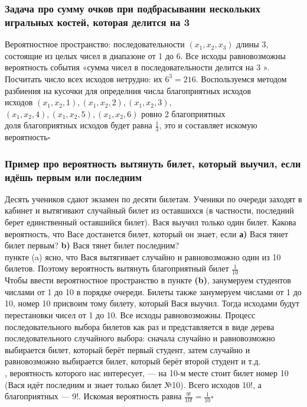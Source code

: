 \documentclass[a4paper]{article}
\newcommand{\qed}{\hfill$\square$}
\begin{document}
\subsubsection*{Задача про сумму очков при подбрасывании нескольких игральных костей, которая делится на 3}
Вероятностное пространство: последовательности $\left(x_1, x_2, x_3\right)$ длины 3, состоящие из целых чисел в диапазоне от 1 до 6. Все исходы равновозможны\\[2mm]
 вероятность события «сумма чисел в последовательности делится на 3 ». Посчитать число всех исходов нетрудно: их $6^3=216$. Воспользуемся методом разбиения на кусочки для определния числа благоприятных исходов\\
 исходов $(x_1, x_2, 1),(x_1, x_2, 2),(x_1, x_2, 3),$ $(x_1, x_2, 4),(x_1, x_2, 5),(x_1, x_2, 6)$ ровно 2 благоприятных\\
 доля благоприятных исходов будет равна $\frac{1}{3}$, это и составляет искомую вероятность\qed

\subsubsection*{Пример про вероятность вытянуть билет, который выучил, если идёшь первым или последним}
Десять учеников сдают экзамен по десяти билетам. Ученики по очереди заходят в кабинет и вытягивают случайный билет из оставшихся (в частности, последний берет единственный оставшийся билет). Вася выучил только один билет. Какова вероятность, что Васе достанется билет, который он знает, если \textbf{а)} Вася тянет билет первым? \textbf{b)} Вася тянет билет последним?\\[2mm]
 пункте (a) ясно, что Вася вытягивает случайно и равновозможно один из 10 билетов. Поэтому вероятность вытянуть благоприятный билет $\frac{1}{10}$\\[2mm]
\indent Чтобы ввести вероятностное пространство в пункте \textbf{(b)}, занумеруем студентов числами от 1 до 10 в порядке очереди. Билеты также занумеруем числами от 1 до 10, номер 10 присвоим тому билету, который Вася выучил. Тогда исходами будут перестановки чисел от 1 до 10. Все исходы равновозможны. Процесс последовательного выбора билетов как раз и представляется в виде дерева последовательного случайного выбора: сначала случайно и равновозможно выбирается билет, который берёт первый студент, затем случайно и равновозможно выбирается билет, который берёт второй студент и т.д.\\[2mm]
, вероятность которого нас интересует, — на 10-м месте стоит билет номер 10 (Вася идёт последним и знает только билет №10). Всего исходов 10!, а благоприятных — 9!. Искомая вероятность равна $\frac{9 !}{10 !}=\frac{1}{10}$\qed\\[2mm]
\end{document}
